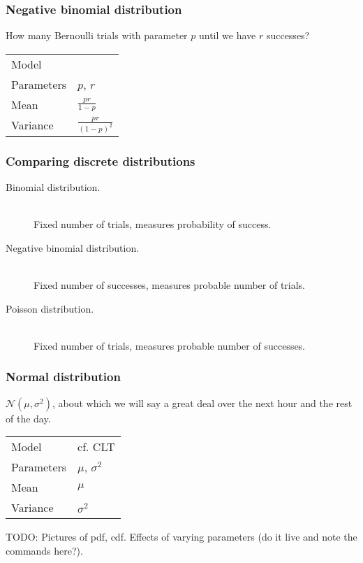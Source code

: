 \documentclass[t]{beamer}
\newcommand\N[0]{\mathcal{N}}
\begin{document}
\begin{frame}
  \frametitle{Negative binomial distribution}

  How many Bernoulli trials with parameter $p$ until we have $r$
  successes?

  \begin{tabular}{ll}
    Model & \\[1mm]
    Parameters & $p$, $r$\\[1mm]
    Mean & $\frac{pr}{1-p}$\\[1mm]
    Variance & $\frac{pr}{(1-p)^2}$
  \end{tabular}

\end{frame}

\begin{frame}
  \frametitle{Comparing discrete distributions}

  \begin{description}
  \item[Binomial distribution.] \hfill \\
    Fixed number of trials, measures probability of success.
  \item[Negative binomial distribution.] \hfill \\
    Fixed number of successes, measures probable number of trials.
  \item[Poisson distribution.] \hfill \\
    Fixed number of trials, measures probable number of successes.
  \end{description}

\end{frame}

\begin{frame}
  \frametitle{Normal distribution}

  $\N(\mu,\sigma^2)$, about which we will say a great deal over the
  next hour and the rest of the day.
  \bigskip
  
  \begin{tabular}{ll}
    Model & cf. CLT\\[1mm]
    Parameters & $\mu$, $\sigma^2$\\[1mm]
    Mean & $\mu$\\[1mm]
    Variance & $\sigma^2$
  \end{tabular}

  TODO: Pictures of pdf, cdf.  Effects of varying parameters (do it live and note the commands here?).
  
  
\end{frame}
\end{document}
